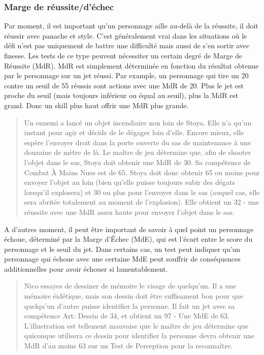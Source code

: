\subsubsection{Marge de réussite/d'échec} \label{sec:marg-succ} 

Par moment, il est important qu'un personnage aille au-delà de la réussite, il doit réussir avec panache et style. C'est généralement vrai dans les situations où le défi n'est pas uniquement de battre une difficulté mais aussi de s'en sortir avec finesse. Les tests de ce type peuvent nécessiter un certain degré de Marge de Réussite (MdR). MdR est simplement déterminée en fonction du résultat obtenue par le personnage sur un jet réussi. Par example, un personnage qui tire un 20 contre un seuil de 55 réussis sont actions avec une MdR de 20. Plus le jet est proche du seuil (mais toujours inférieur ou équal au seuil), plus la MdR est grand. Donc un skill plus haut offrir une MdR plus grande.


\begin{quotation}
   Un ennemi a lancé un objet incendiaire non loin de Stoya. Elle n'a qu'un instant pour agir et décide de le dégager loin d'elle. Encore mieux, elle espère l'envoyer droit dans la porte ouverte du sas de maintenance à une douzaine de mètre de là. Le maître de jeu détermine que, afin de shooter l'objet dans le sas, Stoya doit obtenir une MdR de 30. Sa compétence de Combat À Mains Nues est de 65, Stoya doit donc obtenir 65 ou moins pour envoyer l'objet au loin (bien qu'elle puisse toujours subir des dégats lorsqu'il explosera) et 30 ou plus pour l'envoyer dans le sas (auquel cas, elle sera abritée totalement au moment de l'explosion). Elle obtient un 32 - une réussite avec une MdR assez haute pour envoyer l'objet dans le sas.
\end{quotation} 

A d'autres moment, il peut être important de savoir à quel point un personnage échoue, déterminé par la Marge d'Échec (MdE), qui est l'écart entre le score du personnage et le seuil du jet. Dans certains cas, un test peut indiquer qu'un personnage qui échoue avec une certaine MdE peut souffrir de conséquences additionnelles pour avoir échouer si lamentablement. 

\begin{quotation} Nico essayes de dessiner de mémoire le visage de quelqu'un. Il a une mémoire éidétique, mais son dessin doit être suffisament bon pour que quelqu'un d'autre puisse identifier la personne. Il fait un jet avec sa compétence Art: Dessin de 34, et obtient un 97 - Une MdE de 63. L'illustration est tellement mauvaise que le maître de jeu détermine que quiconque utilisera ce dessin pour identifier la personne devra obtenir une MdR d'au moins 63 sur un Test de Perception pour la reconnaître. \end{quotation} 

